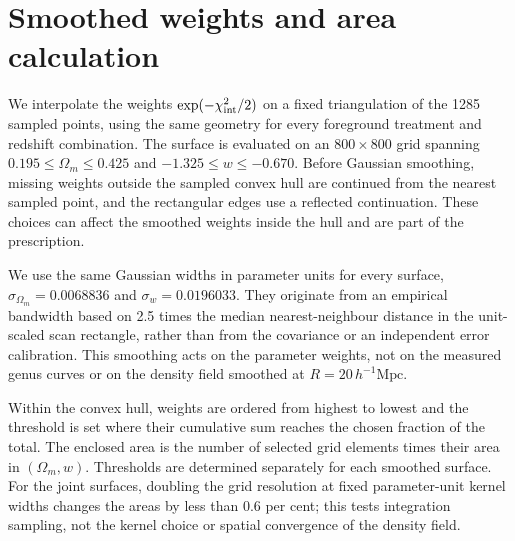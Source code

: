 \section{Smoothed weights and area calculation}\label{app:area}
We interpolate the weights $\exp(-\chi^2_{\rm int}/2)$ on a fixed triangulation of the 1285 sampled points, using the same geometry for every foreground treatment and redshift combination. The surface is evaluated on an $800\times800$ grid spanning $0.195\le\Omega_m\le0.425$ and $-1.325\le w\le-0.670$. Before Gaussian smoothing, missing weights outside the sampled convex hull are continued from the nearest sampled point, and the rectangular edges use a reflected continuation. These choices can affect the smoothed weights inside the hull and are part of the prescription.

We use the same Gaussian widths in parameter units for every surface, $\sigma_{\Omega_m}=0.0068836$ and $\sigma_w=0.0196033$. They originate from an empirical bandwidth based on 2.5 times the median nearest-neighbour distance in the unit-scaled scan rectangle, rather than from the covariance or an independent error calibration. This smoothing acts on the parameter weights, not on the measured genus curves or on the density field smoothed at $R=20\,h^{-1}\mathrm{Mpc}$.

Within the convex hull, weights are ordered from highest to lowest and the threshold is set where their cumulative sum reaches the chosen fraction of the total. The enclosed area is the number of selected grid elements times their area in $(\Omega_m,w)$. Thresholds are determined separately for each smoothed surface. For the joint surfaces, doubling the grid resolution at fixed parameter-unit kernel widths changes the areas by less than 0.6 per cent; this tests integration sampling, not the kernel choice or spatial convergence of the density field.
